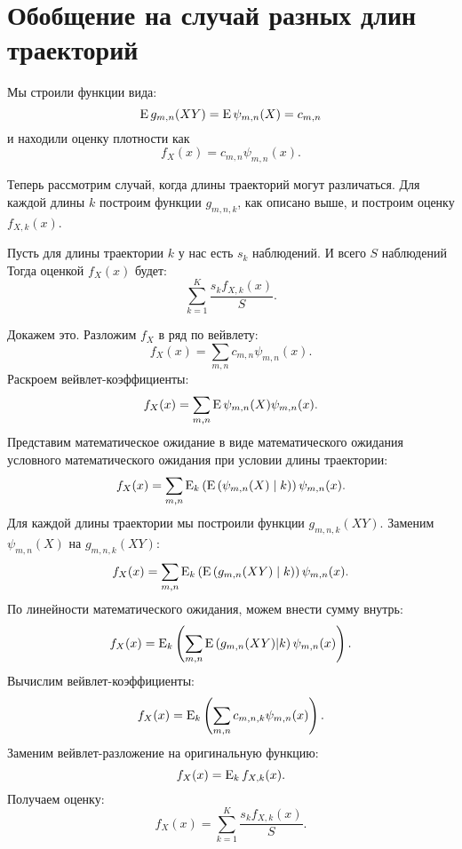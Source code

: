 \documentclass[../paper.tex]{subfiles}
\begin{document}
\section{Обобщение на случай разных длин траекторий}\label{multilength}
Мы строили функции вида:
\[
	\operatorname{E} g_{m,n}(XY) = \operatorname{E} \psi_{m,n}(X) = c_{m,n}
\] и находили оценку плотности как
\[
	f_X(x) = c_{m,n} \psi_{m,n}(x)
.\]

Теперь рассмотрим случай, когда длины траекторий могут различаться.
Для каждой длины $k$ построим функции $g_{m,n,k}$, как описано выше,
и построим оценку $f_{X,k}(x)$.

Пусть для длины траектории $k$ у нас есть $s_k$ наблюдений. И всего $S$ наблюдений
Тогда оценкой $f_X(x)$ будет:
\[
	\sum_{k=1}^K \frac{s_k f_{X,k}(x)}{S}
.\]

Докажем это. Разложим $f_X$ в ряд по вейвлету:
\[
	f_X(x) = \sum_{m,n} c_{m,n} \psi_{m,n}(x).
\]
Раскроем вейвлет-коэффициенты:
\[
	f_X(x)
	= \sum_{m,n} \operatorname{E} \psi_{m,n}(X) \psi_{m,n}(x)
.\]
Представим математическое ожидание в виде математического ожидания условного математического ожидания при условии длины траектории:
\[
	f_X(x) 
	= \sum_{m,n} \operatorname{E}_k \left(\operatorname{E} \left(\psi_{m,n}(X) \mid k \right) \right ) \psi_{m,n}(x).
\]
Для каждой длины траектории мы построили функции $g_{m,n,k}(XY)$. Заменим $\psi_{m,n}(X)$ на $g_{m,n,k}(XY)$:
\[
	f_X(x) 
	= \sum_{m,n} \operatorname{E}_k \left(\operatorname{E} \left(g_{m,n}(XY) \mid k \right) \right ) \psi_{m,n}(x).
\]
По линейности математического ожидания, можем внести сумму внутрь:
\[
  f_X(x) = \operatorname{E}_k \left( \sum_{m,n} \operatorname{E} \left(g_{m,n}(XY) | k \right) \psi_{m,n}(x) \right).
\]
Вычислим вейвлет-коэффициенты:
\[
  f_X(x) = \operatorname{E}_k \left(\sum_{m,n} c_{m,n,k} \psi_{m,n}(x) \right).
\]
Заменим вейвлет-разложение на оригинальную функцию:
\[
  f_X(x) = \operatorname{E}_k f_{X,k}(x).
\]
Получаем оценку:
\[
  f_X(x) = \sum_{k=1}^K \frac{s_k f_{X,k}(x)}{S}.
\]
\end{document}
